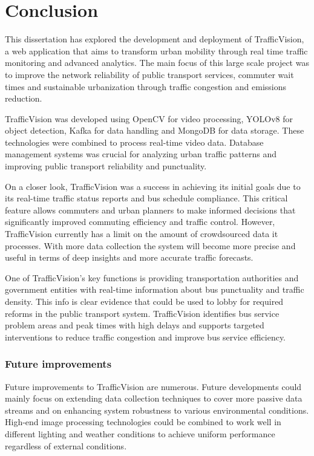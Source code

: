 \chapter{Conclusion}
This dissertation has explored the development and deployment of TrafficVision, a web application that aims to transform urban mobility through real time traffic monitoring and advanced analytics. The main focus of this large scale project was to improve the network reliability of public transport services, commuter wait times and sustainable urbanization through traffic congestion and emissions reduction.

TrafficVision was developed using OpenCV for video processing, YOLOv8 for object detection, Kafka for data handling and MongoDB for data storage. These technologies were combined to process real-time video data. Database management systems was crucial for analyzing urban traffic patterns and improving public transport reliability and punctuality.

On a closer look, TrafficVision was a success in achieving its initial goals due to its real-time traffic status reports and bus schedule compliance. This critical feature allows commuters and urban planners to make informed decisions that significantly improved commuting efficiency and traffic control. However, TrafficVision currently has a limit on the amount of crowdsourced data it processes. With more data collection the system will become more precise and useful in terms of deep insights and more accurate traffic forecasts.

One of TrafficVision's key functions is providing transportation authorities and government entities with real-time information about bus punctuality and traffic density. This info is clear evidence that could be used to lobby for required reforms in the public transport system. TrafficVision identifies bus service problem areas and peak times with high delays and supports targeted interventions to reduce traffic congestion and improve bus service efficiency.

\subsection{Future improvements}
Future improvements to TrafficVision are numerous. Future developments could mainly focus on extending data collection techniques to cover more passive data streams and on enhancing system robustness to various environmental conditions. High-end image processing technologies could be combined to work well in different lighting and weather conditions to achieve uniform performance regardless of external conditions.

